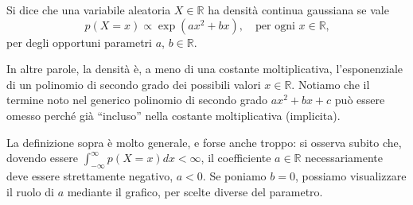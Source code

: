 \documentclass[
  italian,
  letterpaper,
]{book}
\newcommand{\bra}[1]{\left( #1 \right)}
\newcommand{\R}{\mathbb{R}}
\theoremstyle{definition}
\theoremstyle{remark}
\begin{document}
Si dice che una variabile aleatoria \(X \in \R\) ha densità continua
gaussiana se vale
\[ p(X=x) \propto \exp\bra{ ax^2 +bx}, \quad \text{per ogni $x \in \R$,}\]
per degli opportuni parametri \(a\), \(b \in \R\).

In altre parole, la densità è, a meno di una costante moltiplicativa,
l'esponenziale di un polinomio di secondo grado dei possibili valori
\(x \in \R\). Notiamo che il termine noto nel generico polinomio di
secondo grado \(ax^2+bx+c\) può essere omesso perché già ``incluso''
nella costante moltiplicativa (implicita).

La definizione sopra è molto generale, e forse anche troppo: si osserva
subito che, dovendo essere \(\int_{-\infty}^\infty p(X=x)dx < \infty\),
il coefficiente \(a \in \R\) necessariamente deve essere strettamente
negativo, \(a<0\). Se poniamo \(b=0\), possiamo visualizzare il ruolo di
\(a\) mediante il grafico, per scelte diverse del parametro.
\end{document}
